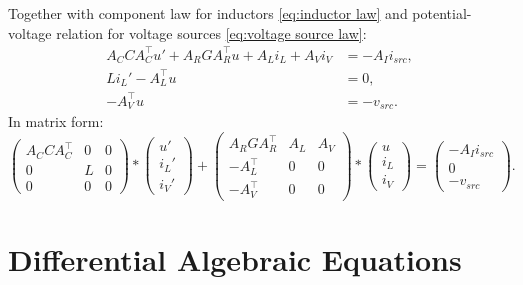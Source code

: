 	\begin{frame}
		Together with component law for inductors \eqref{eq:inductor law} and potential-voltage relation for voltage sources \eqref{eq:voltage source law}:
		\begin{displaymath}
			\begin{aligned}
				A_C C A_C^\top u' + A_R G A_R^\top u + A_L i_L + A_V i_V &= - A_I i_{src} , \\
				L i_L'	- A_L^\top u &= 0 , \\
				-A_V^\top u &=  -v_{src}.
			\end{aligned}	
		\end{displaymath}
		In matrix form:
		\begin{equation}
			\label{MNA_Matrixform}
			\begin{pmatrix}
				A_C C A_C^\top & 0 & 0 \\
				0 & L & 0 \\
				0 & 0 & 0
			\end{pmatrix}
			*
			\begin{pmatrix}
				u' \\
				i_L' \\
				i_V'
			\end{pmatrix}
			+
			\begin{pmatrix}
				A_R G A_R^\top & A_L & A_V \\
				-A_L^\top & 0 & 0 \\
				-A_V^\top & 0 & 0 
			\end{pmatrix}
			*
			\begin{pmatrix}
				u \\
				i_L \\
				i_V
			\end{pmatrix}
			=
			\begin{pmatrix}
				-A_I i_{src} \\
				0 \\
				-v_{src}
			\end{pmatrix} . 
		\end{equation}
	\end{frame}

\section*{Differential Algebraic Equations}
